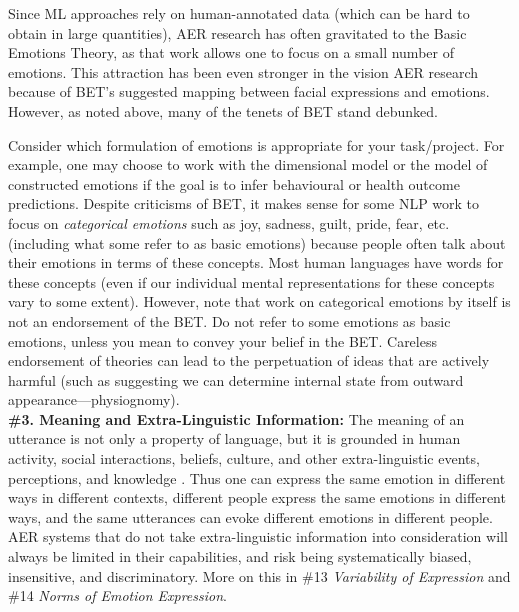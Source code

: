 \documentclass{clv3}
\begin{document}
\vspace*{-3mm}
\noindent Since ML approaches rely on human-annotated data (which can be hard to obtain in large quantities), AER research has often gravitated to the Basic Emotions Theory, as that work allows one to focus on a small number of emotions. This attraction has been even stronger in the vision AER research because of BET’s suggested mapping between facial expressions and emotions. However, as noted above, many of the tenets of BET stand debunked.

Consider which formulation of emotions is appropriate for your task/project. For example, one may choose to work with the dimensional model or the model of constructed emotions if the goal is to infer behavioural or health outcome predictions. 
Despite criticisms of BET, it makes sense for some NLP work to focus on \textit{categorical emotions} such as joy, sadness, guilt, pride, fear, etc. (including what some refer to as basic emotions) because people often talk about their emotions in terms of these concepts. Most human languages have words for these concepts (even if our individual mental representations for these concepts vary to some extent). However, note that work on categorical emotions by itself is not an endorsement of the BET. Do not refer to some emotions as basic emotions, unless you mean to convey your belief in the BET. Careless endorsement of theories can lead to the perpetuation of ideas that are actively harmful (such as suggesting we can determine internal state from outward appearance---physiognomy).\\


\noindent \textbf{\#3. Meaning and Extra-Linguistic Information:} The meaning of an utterance is not only a property of language, but it is grounded in human activity, social interactions, beliefs, culture, and other extra-linguistic events, perceptions, and knowledge 
\cite{harris1954distributional,chomsky2014aspects, ervin1973some,
bisk-etal-2020-experience, bender-koller-2020-climbing,hovy-yang-2021-importance}.
Thus one can express the same emotion in different ways in different contexts, different people express the same emotions in different ways, and the same utterances can evoke different emotions in different people. AER systems that do not take extra-linguistic information into consideration will always be limited in their capabilities, and risk being systematically biased, insensitive, and discriminatory. More on this in \#13 \textit{Variability of Expression} and \#14 \textit{Norms of Emotion Expression}.\\
\end{document}
